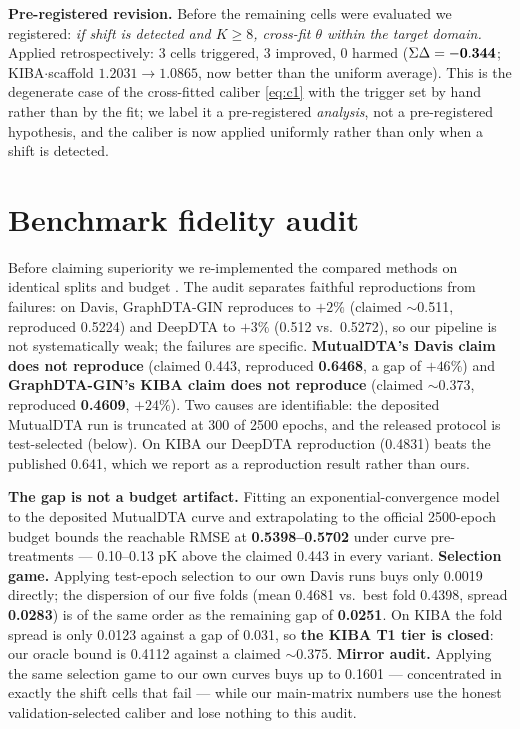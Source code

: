 \documentclass[10pt,letterpaper]{article}
\newcommand{\best}[1]{\ifmmode\mathbf{#1}\else\textbf{#1}\fi}
\begin{document}
\textbf{Pre-registered revision.} Before the remaining cells were evaluated we
registered: \emph{if shift is detected and $K \ge 8$, cross-fit $\theta$ within the
target domain.} Applied retrospectively: 3 cells triggered, 3 improved, 0 harmed
($\Sigma\Delta = \best{-0.344}$; KIBA$\cdot$scaffold $1.2031 \to 1.0865$, now better
than the uniform average). This is the degenerate case of the cross-fitted caliber
\eqref{eq:c1} with the trigger set by hand rather than by the fit; we label it a
pre-registered \emph{analysis}, not a pre-registered hypothesis, and the caliber is
now applied uniformly rather than only when a shift is detected.

\section{Benchmark fidelity audit}
\label{sec:fidelity}

Before claiming superiority we re-implemented the compared methods on identical
splits and budget \citep{ioannidis2005,baker2016}. The audit separates faithful reproductions from failures: on Davis,
GraphDTA-GIN reproduces to $+2\%$ (claimed $\sim$0.511, reproduced 0.5224) and DeepDTA
to $+3\%$ (0.512 vs.\ 0.5272), so our pipeline is not systematically weak; the
failures are specific. \textbf{MutualDTA's Davis claim does not reproduce} (claimed
0.443, reproduced \best{0.6468}, a gap of $+46\%$) and \textbf{GraphDTA-GIN's KIBA
claim does not reproduce} (claimed $\sim$0.373, reproduced \best{0.4609}, $+24\%$).
Two causes are identifiable: the deposited MutualDTA run is truncated at 300 of 2500
epochs, and the released protocol is test-selected (below). On KIBA our DeepDTA
reproduction (0.4831) beats the published 0.641, which we report as a reproduction
result rather than ours.

\textbf{The gap is not a budget artifact.} Fitting an exponential-convergence model
to the deposited MutualDTA curve and extrapolating to the official 2500-epoch budget
bounds the reachable RMSE at \textbf{0.5398--0.5702} under curve pre-treatments ---
0.10--0.13 pK above the claimed 0.443 in every variant. \textbf{Selection game.}
Applying test-epoch selection to our own Davis runs buys only 0.0019 directly; the
dispersion of our five folds (mean 0.4681 vs.\ best fold 0.4398, spread
\textbf{0.0283}) is of the same order as the remaining gap of \textbf{0.0251}. On
KIBA the fold spread is only 0.0123 against a gap of 0.031, so \textbf{the KIBA T1
tier is closed}: our oracle bound is 0.4112 against a claimed $\sim$0.375.
\textbf{Mirror audit.} Applying the same selection game to our own curves buys up to
0.1601 --- concentrated in exactly the shift cells that fail --- while our
main-matrix numbers use the honest validation-selected caliber and lose nothing to
this audit.
\end{document}
